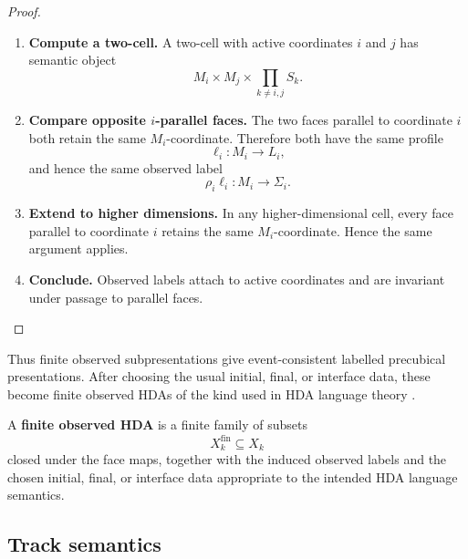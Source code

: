 \begin{proof}
    \leavevmode
    \begin{enumerate}
        \item \textbf{Compute a two-cell.}
        A two-cell with active coordinates \(i\) and \(j\) has semantic object
        \[
            M_i\times M_j\times\prod_{k\neq i,j}S_k.
        \]

        \item \textbf{Compare opposite \(i\)-parallel faces.}
        The two faces parallel to coordinate \(i\) both retain the same
        \(M_i\)-coordinate. Therefore both have the same profile
        \[
            \ell_i:M_i\to L_i,
        \]
        and hence the same observed label
        \[
            \rho_i\ell_i:M_i\to\Sigma_i.
        \]

        \item \textbf{Extend to higher dimensions.}
        In any higher-dimensional cell, every face parallel to coordinate
        \(i\) retains the same \(M_i\)-coordinate. Hence the same argument
        applies.

        \item \textbf{Conclude.}
        Observed labels attach to active coordinates and are invariant under
        passage to parallel faces.
    \end{enumerate}
\end{proof}

Thus finite observed subpresentations give event-consistent labelled
precubical presentations. After choosing the usual initial, final, or
interface data, these become finite observed HDAs of the kind used in HDA
language theory
\cite{FahrenbergJohansenStruthZiemianski2021,Fahrenberg_2024}.

\begin{definition}
\label{def:cmett-finite-observed-hda}
    A \textbf{finite observed HDA} is a finite family of subsets
    \[
        X_k^{\mathrm{fin}}\subseteq X_k
    \]
    closed under the face maps, together with the induced observed labels and
    the chosen initial, final, or interface data appropriate to the intended
    HDA language semantics.
\end{definition}

\subsection{Track semantics}
\label{subsec:cmett-track-semantics}

